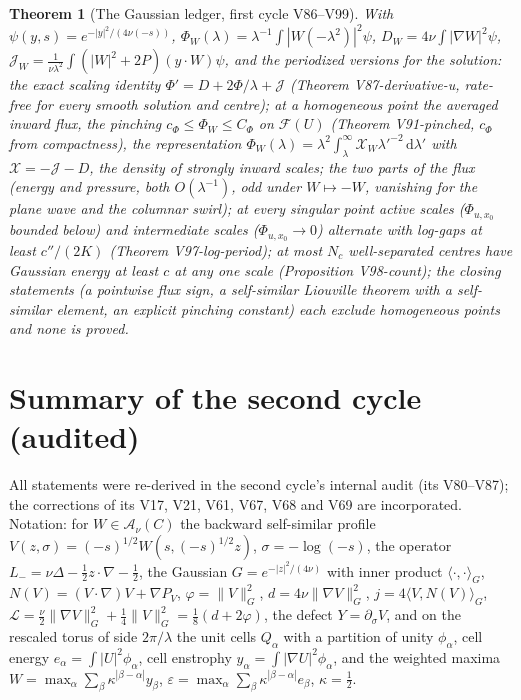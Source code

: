 \documentclass[11pt]{article}
\newcommand{\dd}{\,\mathrm d}
\theoremstyle{plain}
\newtheorem{theorem}{Theorem}[section]
\theoremstyle{definition}
\theoremstyle{remark}
\begin{document}
\begin{theorem}[The Gaussian ledger, first cycle V86--V99]
\label{thm:c4v1-gaussian}
With \(\psi(y,s)=e^{-|y|^2/(4\nu(-s))}\), \(\Phi_W(\lambda)=\lambda^{-1}\int|W(-\lambda^2)|^2\psi\),
\(D_W=4\nu\int|\nabla W|^2\psi\), \(\mathcal J_W=\frac1{\nu\lambda^2}\int(|W|^2+2P)(y\cdot W)\psi\),
and the periodized versions for the solution: the exact scaling
identity \(\Phi'=D+2\Phi/\lambda+\mathcal J\) (Theorem V87-derivative-u,
rate-free for every smooth solution and centre); at a homogeneous
point the averaged inward flux, the pinching \(c_\Phi\le\Phi_W\le C_\Phi\)
on \(\mathcal F(U)\) (Theorem V91-pinched, \(c_\Phi\) from compactness), the
representation \(\Phi_W(\lambda)=\lambda^2\int_\lambda^\infty\mathcal X_W\lambda'^{-2}\dd\lambda'\) with
\(\mathcal X=-\mathcal J-D\), the density of strongly inward scales; the
two parts of the flux (energy and pressure, both \(O(\lambda^{-1})\), odd
under \(W\mapsto-W\), vanishing for the plane wave and the columnar
swirl); at every singular point active scales (\(\Phi_{u,x_0}\) bounded
below) and intermediate scales (\(\Phi_{u,x_0}\to0\)) alternate with
log-gaps at least \(c''/(2K)\) (Theorem V97-log-period); at most \(N_c\)
well-separated centres have Gaussian energy at least \(c\) at any one
scale (Proposition V98-count); the closing statements (a pointwise
flux sign, a self-similar Liouville theorem with a self-similar
element, an explicit pinching constant) each exclude homogeneous
points and none is proved.
\end{theorem}

\section{Summary of the second cycle (audited)}
\label{sec:c4v1-cycle2}

All statements were re-derived in the second cycle's internal audit
(its V80--V87); the corrections of its V17, V21, V61, V67, V68 and V69
are incorporated.  Notation: for \(W\in\mathcal A_\nu(C)\) the backward
self-similar profile \(V(z,\sigma)=(-s)^{1/2}W(s,(-s)^{1/2}z)\),
\(\sigma=-\log(-s)\), the operator \(L_-=\nu\Delta-\frac12z\cdot\nabla-\frac12\), the
Gaussian \(G=e^{-|z|^2/(4\nu)}\) with inner product \(\langle\cdot,\cdot\rangle_G\),
\(N(V)=(V\cdot\nabla)V+\nabla P_V\), \(\varphi=\|V\|_G^2\), \(d=4\nu\|\nabla V\|_G^2\),
\(j=4\langle V,N(V)\rangle_G\), \(\mathcal L=\frac\nu2\|\nabla V\|_G^2+\frac14\|V\|_G^2=\frac18(d+2\varphi)\),
the defect \(Y=\partial_\sigma V\), and on the rescaled torus of side
\(2\pi/\lambda\) the unit cells \(Q_\alpha\) with a partition of unity
\(\phi_\alpha\), cell energy \(e_\alpha=\int|U|^2\phi_\alpha\), cell enstrophy
\(y_\alpha=\int|\nabla U|^2\phi_\alpha\), and the weighted maxima
\(W=\max_\alpha\sum_\beta\kappa^{|\beta-\alpha|}y_\beta\), \(\varepsilon=\max_\alpha\sum_\beta\kappa^{|\beta-\alpha|}e_\beta\), \(\kappa=\frac12\).
\end{document}
